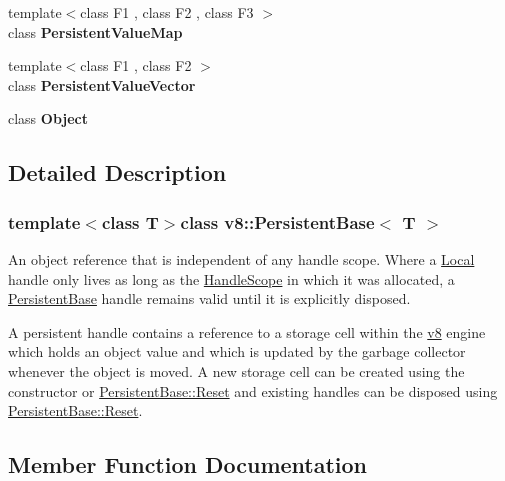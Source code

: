 \begin{DoxyCompactItemize}
\item 
\hypertarget{classv8_1_1PersistentBase_a401e5cd2db49a67497042617f01fdbc2}{}{\footnotesize template$<$class F1 , class F2 , class F3 $>$ }\\class {\bfseries Persistent\+Value\+Map}\label{classv8_1_1PersistentBase_a401e5cd2db49a67497042617f01fdbc2}

\item 
\hypertarget{classv8_1_1PersistentBase_a978bb1377559897d74d5fe883a54a315}{}{\footnotesize template$<$class F1 , class F2 $>$ }\\class {\bfseries Persistent\+Value\+Vector}\label{classv8_1_1PersistentBase_a978bb1377559897d74d5fe883a54a315}

\item 
\hypertarget{classv8_1_1PersistentBase_a0720b5f434e636e22a3ed34f847eec57}{}class {\bfseries Object}\label{classv8_1_1PersistentBase_a0720b5f434e636e22a3ed34f847eec57}

\end{DoxyCompactItemize}


\subsection{Detailed Description}
\subsubsection*{template$<$class T$>$class v8\+::\+Persistent\+Base$<$ T $>$}

An object reference that is independent of any handle scope. Where a \hyperlink{classv8_1_1Local}{Local} handle only lives as long as the \hyperlink{classv8_1_1HandleScope}{Handle\+Scope} in which it was allocated, a \hyperlink{classv8_1_1PersistentBase}{Persistent\+Base} handle remains valid until it is explicitly disposed.

A persistent handle contains a reference to a storage cell within the \hyperlink{namespacev8}{v8} engine which holds an object value and which is updated by the garbage collector whenever the object is moved. A new storage cell can be created using the constructor or \hyperlink{classv8_1_1PersistentBase_a174bb1e45b18fd4eeaee033622825bb8}{Persistent\+Base\+::\+Reset} and existing handles can be disposed using \hyperlink{classv8_1_1PersistentBase_a174bb1e45b18fd4eeaee033622825bb8}{Persistent\+Base\+::\+Reset}. 

\subsection{Member Function Documentation}
\hypertarget{classv8_1_1PersistentBase_a4a64c26d91ed6a276aa8a7ca4bb7683a}{}
